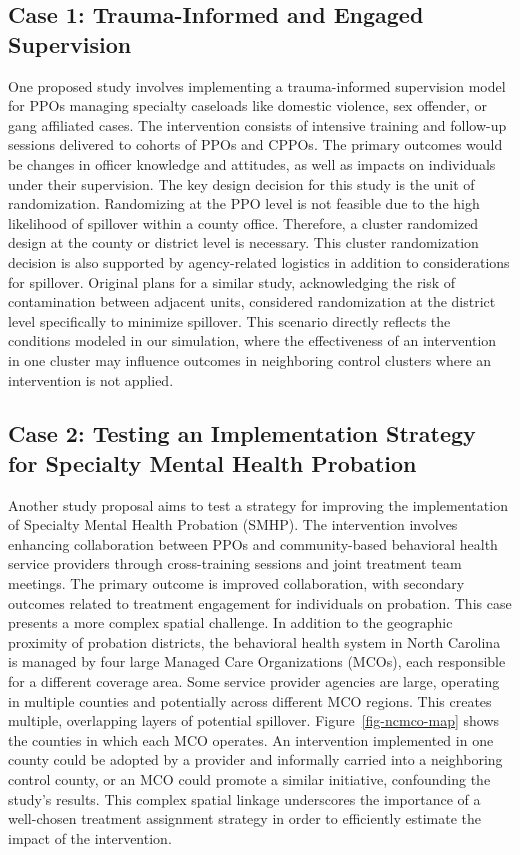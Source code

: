 \documentclass[
  12pt,
  prelim]{bios-prelim}
\begin{document}
\subsection{Case 1: Trauma-Informed and Engaged
Supervision}\label{case-1-trauma-informed-and-engaged-supervision}

One proposed study involves implementing a trauma-informed supervision
model for PPOs managing specialty caseloads like domestic violence, sex
offender, or gang affiliated cases. The intervention consists of
intensive training and follow-up sessions delivered to cohorts of PPOs
and CPPOs. The primary outcomes would be changes in officer knowledge
and attitudes, as well as impacts on individuals under their
supervision. The key design decision for this study is the unit of
randomization. Randomizing at the PPO level is not feasible due to the
high likelihood of spillover within a county office. Therefore, a
cluster randomized design at the county or district level is necessary.
This cluster randomization decision is also supported by agency-related
logistics in addition to considerations for spillover. Original plans
for a similar study, acknowledging the risk of contamination between
adjacent units, considered randomization at the district level
specifically to minimize spillover. This scenario directly reflects the
conditions modeled in our simulation, where the effectiveness of an
intervention in one cluster may influence outcomes in neighboring
control clusters where an intervention is not applied.

\subsection{Case 2: Testing an Implementation Strategy for Specialty
Mental Health
Probation}\label{case-2-testing-an-implementation-strategy-for-specialty-mental-health-probation}

Another study proposal aims to test a strategy for improving the
implementation of Specialty Mental Health Probation (SMHP). The
intervention involves enhancing collaboration between PPOs and
community-based behavioral health service providers through
cross-training sessions and joint treatment team meetings. The primary
outcome is improved collaboration, with secondary outcomes related to
treatment engagement for individuals on probation. This case presents a
more complex spatial challenge. In addition to the geographic proximity
of probation districts, the behavioral health system in North Carolina
is managed by four large Managed Care Organizations (MCOs), each
responsible for a different coverage area. Some service provider
agencies are large, operating in multiple counties and potentially
across different MCO regions. This creates multiple, overlapping layers
of potential spillover. Figure~\ref{fig-ncmco-map} shows the counties in
which each MCO operates. An intervention implemented in one county could
be adopted by a provider and informally carried into a neighboring
control county, or an MCO could promote a similar initiative,
confounding the study's results. This complex spatial linkage
underscores the importance of a well-chosen treatment assignment
strategy in order to efficiently estimate the impact of the
intervention.
\end{document}
